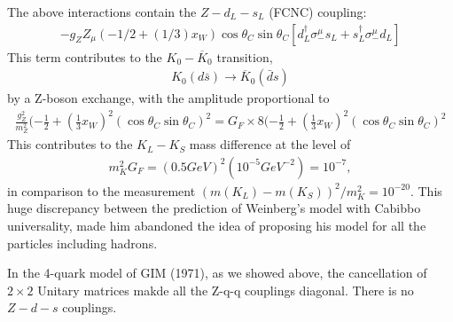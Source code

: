 \documentclass[12pt]{article}
\begin{document}
The above interactions contain the $Z-d_L-s_L$ (FCNC) coupling:
\begin{eqnarray}
  -g_Z Z_\mu (-1/2+(1/3)x_W) \cos\theta_C \sin\theta_C
[ d_L^\dagger \sigma_-^\mu s_L + s_L^\dagger \sigma_-^\mu d_L ]
\end{eqnarray}
This term contributes to the $K_0-{\overline K_0}$ transition,
\begin{eqnarray}
  K_0(d \bar s) \to {\overline K_0}( \bar d s)
\end{eqnarray}
  by a Z-boson exchange, with the amplitude proportional to
\begin{eqnarray}
  \frac{g_Z^2}{m_Z^2} (-\frac{1}{2}+(\frac{1}{3}x_W)^2 (\cos\theta_C \sin\theta_C)^2
  =
  G_F \times 8 (-\frac{1}{2}+(\frac{1}{3}x_W)^2 (\cos\theta_C \sin\theta_C)^2
\end{eqnarray}
  This contributes to the $K_L-K_S$ mass difference at the level of 
  \begin{eqnarray}
    m_K^2 G_F = (0.5 GeV)^2 (10^{-5} GeV^{-2}) = 10^{-7},
  \end{eqnarray} 
  in comparison to the measurement
  $(m(K_L)-m(K_S))^2/m_K^2 = 10^{-20}$.
  This huge discrepancy between the prediction of Weinberg's model with
  Cabibbo universality, made him abandoned the idea of proposing his
  model for all the particles including hadrons.

  In the 4-quark model of GIM (1971), as we showed above, the cancellation
  of $2 \times 2$ Unitary matrices makde all the Z-q-q couplings diagonal.  There is no $Z-d-s$ couplings.
\end{document}
